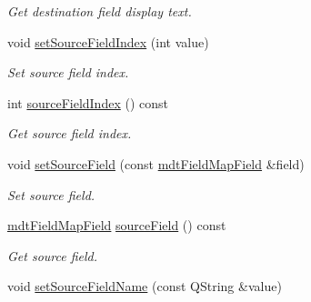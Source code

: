 \begin{DoxyCompactItemize}
\begin{DoxyCompactList}\small\item\em Get destination field display text. \end{DoxyCompactList}\item 
\hypertarget{classmdt_field_map_item_a6417b5e9d5cabba4744550e69869b0da}{
void \hyperlink{classmdt_field_map_item_a6417b5e9d5cabba4744550e69869b0da}{setSourceFieldIndex} (int value)}
\label{classmdt_field_map_item_a6417b5e9d5cabba4744550e69869b0da}

\begin{DoxyCompactList}\small\item\em Set source field index. \end{DoxyCompactList}\item 
\hypertarget{classmdt_field_map_item_a008cc7bc43612f6df87ba62e14aed6ab}{
int \hyperlink{classmdt_field_map_item_a008cc7bc43612f6df87ba62e14aed6ab}{sourceFieldIndex} () const }
\label{classmdt_field_map_item_a008cc7bc43612f6df87ba62e14aed6ab}

\begin{DoxyCompactList}\small\item\em Get source field index. \end{DoxyCompactList}\item 
\hypertarget{classmdt_field_map_item_aebc97db4285cd4c5181082eb57fa5c1f}{
void \hyperlink{classmdt_field_map_item_aebc97db4285cd4c5181082eb57fa5c1f}{setSourceField} (const \hyperlink{classmdt_field_map_field}{mdtFieldMapField} \&field)}
\label{classmdt_field_map_item_aebc97db4285cd4c5181082eb57fa5c1f}

\begin{DoxyCompactList}\small\item\em Set source field. \end{DoxyCompactList}\item 
\hypertarget{classmdt_field_map_item_ac5d68caf99c007635c16dcc1f0ffff6c}{
\hyperlink{classmdt_field_map_field}{mdtFieldMapField} \hyperlink{classmdt_field_map_item_ac5d68caf99c007635c16dcc1f0ffff6c}{sourceField} () const }
\label{classmdt_field_map_item_ac5d68caf99c007635c16dcc1f0ffff6c}

\begin{DoxyCompactList}\small\item\em Get source field. \end{DoxyCompactList}\item 
\hypertarget{classmdt_field_map_item_a5cd708ef0209f51503b110883b564415}{
void \hyperlink{classmdt_field_map_item_a5cd708ef0209f51503b110883b564415}{setSourceFieldName} (const QString \&value)}
\label{classmdt_field_map_item_a5cd708ef0209f51503b110883b564415}


\end{DoxyCompactItemize}
